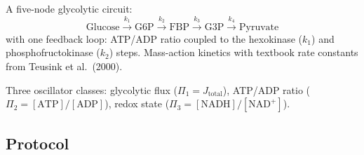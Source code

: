 \documentclass[11pt,a4paper]{article}
\theoremstyle{expthm}
\theoremstyle{definition}
\theoremstyle{remark}
\begin{document}
A five-node glycolytic circuit:
\begin{equation}
\text{Glucose} \xrightarrow{k_1} \text{G6P}
\xrightarrow{k_2} \text{FBP}
\xrightarrow{k_3} \text{G3P}
\xrightarrow{k_4} \text{Pyruvate}
\label{eq:glycolysis-model}
\end{equation}
with one feedback loop: ATP/ADP ratio coupled to the hexokinase ($k_1$)
and phosphofructokinase ($k_2$) steps. Mass-action kinetics with
textbook rate constants from Teusink et al.\ (2000).

Three oscillator classes: glycolytic flux ($\Pi_1 = J_{\mathrm{total}}$),
ATP/ADP ratio ($\Pi_2 = [\mathrm{ATP}]/[\mathrm{ADP}]$), redox state
($\Pi_3 = [\mathrm{NADH}]/[\mathrm{NAD}^+]$).

\subsection{Protocol}
\end{document}
